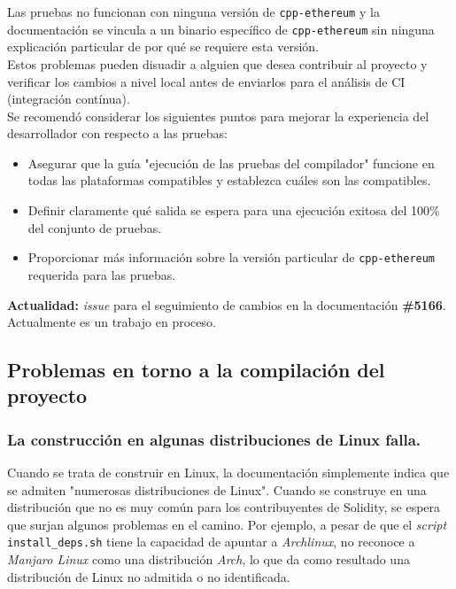 Las pruebas no funcionan con ninguna versión de \verb|cpp-ethereum| y la documentación se vincula a un binario específico de \verb|cpp-ethereum| sin ninguna explicación particular de por qué se requiere esta versión.\\

Estos problemas pueden disuadir a alguien que desea contribuir al proyecto y verificar los cambios a nivel local antes de enviarlos para el análisis de CI (integración contínua).\\

Se recomendó considerar los siguientes puntos para mejorar la experiencia del desarrollador con respecto a las pruebas:
\begin{itemize}
  \item Asegurar que la guía "ejecución de las pruebas del compilador" funcione en todas las plataformas compatibles y establezca cuáles son las compatibles.
  \item Definir claramente qué salida se espera para una ejecución exitosa del 100\% del conjunto de pruebas.
  \item Proporcionar más información sobre la versión particular de \verb|cpp-ethereum| requerida para las pruebas.
\end{itemize}

\textbf{Actualidad:} \textit{issue} para el seguimiento de cambios en la documentación \textbf{\#5166}\cite{GHI5166}. Actualmente es un trabajo en proceso.

\subsection{Problemas en torno a la compilación del proyecto}

\subsubsection{La construcción en algunas distribuciones de Linux falla.}
Cuando se trata de construir en Linux, la documentación simplemente indica que se admiten "numerosas distribuciones de Linux"\cite{SolidityRTDExternalDeps}. Cuando se construye en una distribución que no es muy común para los contribuyentes de Solidity, se espera que surjan algunos problemas en el camino. Por ejemplo, a pesar de que el \textit{script} \verb|install_deps.sh|\cite{SolidityScriptInstallDeps} tiene la capacidad de apuntar a \textit{Archlinux}, no reconoce a \textit{Manjaro Linux} como una distribución \textit{Arch}, lo que da como resultado una distribución de Linux no admitida o no identificada.\\

